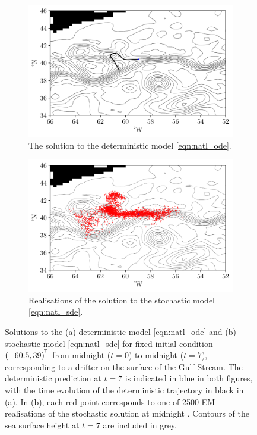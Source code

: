\begin{figure}
	\centering
	\begin{subfigure}[t]{0.7\textwidth}
		\includegraphics[width=\textwidth]{chp06_applications/figures/gulf_stream/det_traj.pdf}
		\caption{The solution to the deterministic model \cref{eqn:natl_ode}.}
		\label{fig:natl_det_traj}
	\end{subfigure}
	\begin{subfigure}[t]{0.7\textwidth}
		\includegraphics[width=\textwidth]{chp06_applications/figures/gulf_stream/traj_stoch_rels}
		\caption{Realisations of the solution to the stochastic model \cref{eqn:natl_sde}.}
		\label{fig:natl_stoch_rels}
	\end{subfigure}
	\caption{Solutions to the (a) deterministic model \cref{eqn:natl_ode} and (b) stochastic model \cref{eqn:natl_sde} for fixed initial condition \((-60.5, 39)^{^{\!\top}}\) from midnight  (\(t = 0\)) to midnight  (\(t = 7\)), corresponding to a drifter on the surface of the Gulf Stream.
		The deterministic prediction at \(t = 7\) is indicated in blue in both figures, with the time evolution of the deterministic trajectory in black in (a).
		In (b), each red point corresponds to one of 2500 EM realisations of the stochastic solution at midnight .
		Contours of the sea surface height at \(t = 7\) are included in grey.}
\end{figure}


